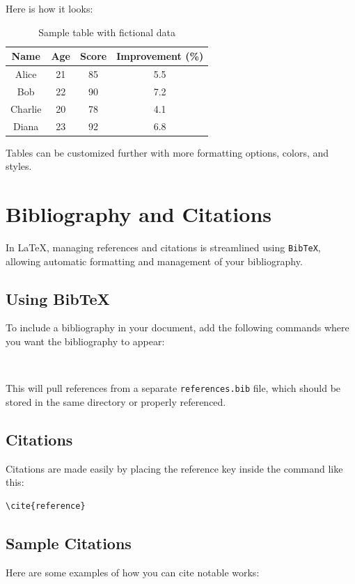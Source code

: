 \documentclass{article}
\begin{document}
Here is how it looks:

\begin{table}[h]
    \centering
    \begin{tabular}{|c|c|c|c|}
        \hline
        \textbf{Name} & \textbf{Age} & \textbf{Score} & \textbf{Improvement (\%)} \\
        \hline
        Alice & 21 & 85 & 5.5 \\
        Bob & 22 & 90 & 7.2 \\
        Charlie & 20 & 78 & 4.1 \\
        Diana & 23 & 92 & 6.8 \\
        \hline
    \end{tabular}
    \caption{Sample table with fictional data}
\end{table}

Tables can be customized further with more formatting options, colors, and styles.

\newpage

\section*{Bibliography and Citations}

In LaTeX, managing references and citations is streamlined using \texttt{BibTeX}, allowing automatic formatting and management of your bibliography.

\subsection*{Using BibTeX}
To include a bibliography in your document, add the following commands where you want the bibliography to appear:
\begin{verbatim}


\end{verbatim}
This will pull references from a separate \texttt{references.bib} file, which should be stored in the same directory or properly referenced.

\subsection*{Citations}
Citations are made easily by placing the reference key inside the command like this:
\begin{verbatim}
\cite{reference}
\end{verbatim}

\subsection*{Sample Citations}
Here are some examples of how you can cite notable works:
\end{document}
